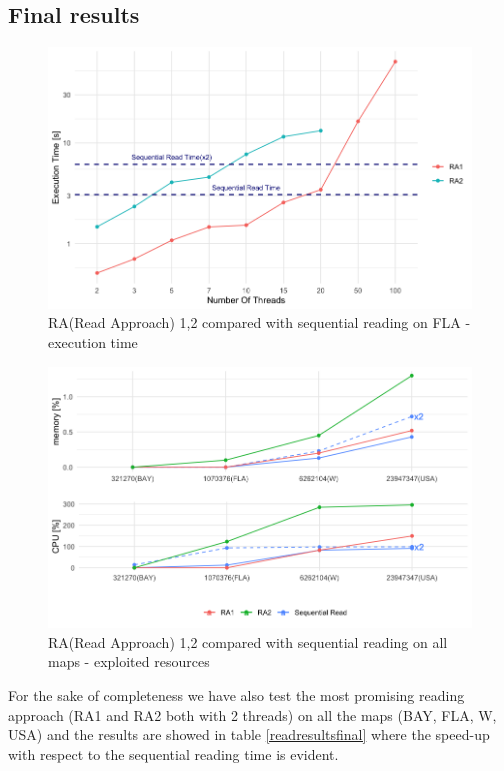 \documentclass[twocolumn, switch]{article} %
\begin{document}
\subsection{Final results}
\begin{figure}[ht!]
  \centering
  \includegraphics[width=1\linewidth]{read/par_read_all_time.png}
  \caption{RA(Read Approach) 1,2 compared with sequential reading on FLA - execution time}
  \label{parreadalltime}
\end{figure}
\begin{figure}[ht!]
  \centering
  \includegraphics[width=1\linewidth]{read/parread_cpumem.png}
  \caption{RA(Read Approach) 1,2 compared with sequential reading on all maps - exploited resources}
  \label{parreadallcpumem}
\end{figure}
For the sake of completeness we have also test the most promising reading approach (RA1 and RA2 both with
2 threads) on all the maps (BAY, FLA, W, USA) and the results are showed in table \ref{readresultsfinal}
where the speed-up with respect to the sequential reading time is evident.
\end{document}
